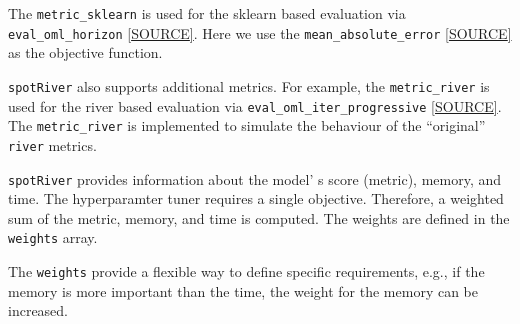 \documentclass[
  letterpaper,
  DIV=11,
  numbers=noendperiod]{scrreprt}
\begin{document}
The \texttt{metric\_sklearn} is used for the sklearn based evaluation
via \texttt{eval\_oml\_horizon}
\href{https://github.com/sequential-parameter-optimization/spotRiver/blob/main/src/spotRiver/evaluation/eval_bml.py}{{[}SOURCE{]}}.
Here we use the \texttt{mean\_absolute\_error}
\href{https://scikit-learn.org/stable/modules/generated/sklearn.metrics.mean_absolute_error.html}{{[}SOURCE{]}}
as the objective function.

\begin{tcolorbox}[enhanced jigsaw, coltitle=black, bottomrule=.15mm, breakable, toprule=.15mm, colframe=quarto-callout-note-color-frame, title=\textcolor{quarto-callout-note-color}{\faInfo}\hspace{0.5em}{Note: Additional metrics}, colbacktitle=quarto-callout-note-color!10!white, opacityback=0, left=2mm, leftrule=.75mm, colback=white, rightrule=.15mm, bottomtitle=1mm, toptitle=1mm, titlerule=0mm, arc=.35mm, opacitybacktitle=0.6]

\texttt{spotRiver} also supports additional metrics. For example, the
\texttt{metric\_river} is used for the river based evaluation via
\texttt{eval\_oml\_iter\_progressive}
\href{https://github.com/sequential-parameter-optimization/spotRiver/blob/main/src/spotRiver/evaluation/eval_oml.py}{{[}SOURCE{]}}.
The \texttt{metric\_river} is implemented to simulate the behaviour of
the ``original'' \texttt{river} metrics.

\end{tcolorbox}

\texttt{spotRiver} provides information about the model' s score
(metric), memory, and time. The hyperparamter tuner requires a single
objective. Therefore, a weighted sum of the metric, memory, and time is
computed. The weights are defined in the \texttt{weights} array.

\begin{tcolorbox}[enhanced jigsaw, coltitle=black, bottomrule=.15mm, breakable, toprule=.15mm, colframe=quarto-callout-note-color-frame, title=\textcolor{quarto-callout-note-color}{\faInfo}\hspace{0.5em}{Note: Weights}, colbacktitle=quarto-callout-note-color!10!white, opacityback=0, left=2mm, leftrule=.75mm, colback=white, rightrule=.15mm, bottomtitle=1mm, toptitle=1mm, titlerule=0mm, arc=.35mm, opacitybacktitle=0.6]

The \texttt{weights} provide a flexible way to define specific
requirements, e.g., if the memory is more important than the time, the
weight for the memory can be increased.

\end{tcolorbox}
\end{document}
